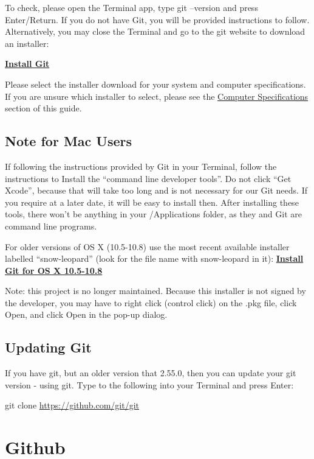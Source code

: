 \documentclass[
]{book}
\begin{document}
To check, please open the Terminal app, type git --version and press Enter/Return. If you do not have Git, you will be provided instructions to follow. Alternatively, you may close the Terminal and go to the git website to download an installer:

\textbf{\href{https://git-scm.com/downloads}{Install Git}}

Please select the installer download for your system and computer specifications. If you are unsure which installer to select, please see the \hyperref[Computer-Specifications]{Computer Specifications} section of this guide.

\subsection{Note for Mac Users}\label{note-for-mac-users}

If following the instructions provided by Git in your Terminal, follow the instructions to Install the ``command line developer tools''. Do not click ``Get Xcode'', because that will take too long and is not necessary for our Git needs. If you require at a later date, it will be easy to install then. After installing these tools, there won't be anything in your /Applications folder, as they and Git are command line programs.

For older versions of OS X (10.5-10.8) use the most recent available installer labelled ``snow-leopard'' (look for the file name with snow-leopard in it): \textbf{\href{https://sourceforge.net/projects/git-osx-installer/files/}{Install Git for OS X 10.5-10.8}}

Note: this project is no longer maintained. Because this installer is not signed by the developer, you may have to right click (control click) on the .pkg file, click Open, and click Open in the pop-up dialog.

\subsection{Updating Git}\label{updating-git}

If you have git, but an older version that 2.55.0, then you can update your git version - using git. Type to the following into your Terminal and press Enter:

git clone \url{https://github.com/git/git}

\section{Github}\label{installing-github}
\end{document}
